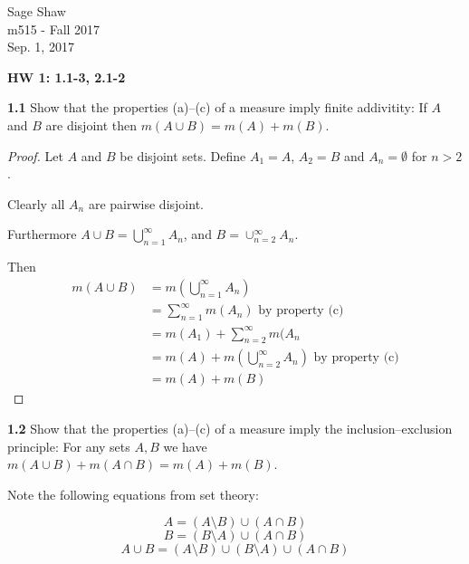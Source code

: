 \documentclass[12pt]{article}
\begin{document}
	\thispagestyle{empty}
	
	\begin{flushright}
		Sage Shaw \\
		m515 - Fall 2017 \\
		Sep. 1, 2017
	\end{flushright}
	
	{\large \textbf{HW 1: 1.1-3, 2.1-2}}\bigbreak

	\hspace{-4 ex}\textbf{1.1} Show that the properties (a)--(c) of a measure imply finite addivitity: If $A$ and $B$ are disjoint then $m(A\cup B)=m(A)+m(B)$.
	
	
	\begin{proof}
		 Let $A$ and $B$ be disjoint sets. Define $A_{1}=A$, $A_{2}=B$ and $A_{n}=\emptyset$ for $n>2$.
	
	Clearly all $A_{n}$ are pairwise disjoint.
	
	Furthermore $A \cup B = \bigcup_{n=1}^{\infty}A_{n}$, and $B = \cup_{n=2}^{\infty}A_{n}$.
	
	Then
	\begin{equation*}
	\begin{split}
	m(A \cup B) & = m(\bigcup\limits_{n=1}^{\infty}A_{n}) \\
	& = \sum_{n=1}^{\infty}m(A_{n}) \text{ by property (c)} \\
	& = m(A_{1}) + \sum_{n=2}^{\infty}m(A_{n} \\
	& = m(A) + m(\bigcup\limits_{n=2}^{\infty}A_{n}) \text{ by property (c)} \\
	& = m(A) + m(B)
	\end{split}
	\end{equation*}
	
	\end{proof}

\bigbreak
\bigbreak



	\hspace{-4 ex}\textbf{1.2} Show that the properties (a)--(c) of a measure imply the inclusion--exclusion principle: For any sets $A,B$ we have $m(A\cup B)+m(A\cap B)=m(A)+m(B)$.
	
	Note the following equations from set theory:
	
	\begin{equation}
	A = (A \setminus B) \cup (A \cap B)
	\end{equation}
	\begin{equation}
	B = (B \setminus A) \cup (A \cap B)
	\end{equation}
	\begin{equation}
	A \cup B = (A \setminus B) \cup (B \setminus A) \cup (A \cap B)
	\end{equation}
	
\end{document}
